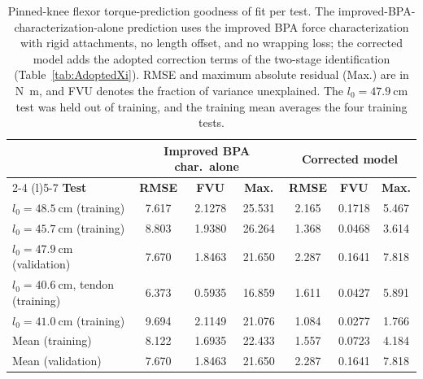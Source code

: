 \begin{table}[htbp]
\caption{Pinned-knee flexor torque-prediction goodness of fit per test. The improved-BPA-characterization-alone prediction uses the improved BPA force characterization with rigid attachments, no length offset, and no wrapping loss; the corrected model adds the adopted correction terms of the two-stage identification (Table~\ref{tab:AdoptedXi}). RMSE and maximum absolute residual (Max.) are in \unit{\newton\meter}, and FVU denotes the fraction of variance unexplained. The $l_{0}=\qty{47.9}{\cm}$ test was held out of training, and the training mean averages the four training tests.}
\label{tab:FlxPinGof}
\begin{tabular}{@{}lcccccc@{}}
\toprule
& \multicolumn{3}{c}{\textbf{Improved BPA char.\ alone}} & \multicolumn{3}{c}{\textbf{Corrected model}} \\
\cmidrule(lr){2-4} \cmidrule(l){5-7}
\textbf{Test} & \textbf{RMSE} & \textbf{FVU} & \textbf{Max.} & \textbf{RMSE} & \textbf{FVU} & \textbf{Max.} \\
\midrule
$l_{0}=\qty{48.5}{\cm}$ (training)        & 7.617 & 2.1278 & 25.531 & 2.165 & 0.1718 & 5.467 \\
$l_{0}=\qty{45.7}{\cm}$ (training)        & 8.803 & 1.9380 & 26.264 & 1.368 & 0.0468 & 3.614 \\
$l_{0}=\qty{47.9}{\cm}$ (validation)      & 7.670 & 1.8463 & 21.650 & 2.287 & 0.1641 & 7.818 \\
$l_{0}=\qty{40.6}{\cm}$, tendon (training) & 6.373 & 0.5935 & 16.859 & 1.611 & 0.0427 & 5.891 \\
$l_{0}=\qty{41.0}{\cm}$ (training)        & 9.694 & 2.1149 & 21.076 & 1.084 & 0.0277 & 1.766 \\
\midrule
Mean (training)                           & 8.122 & 1.6935 & 22.433 & 1.557 & 0.0723 & 4.184 \\
Mean (validation)                         & 7.670 & 1.8463 & 21.650 & 2.287 & 0.1641 & 7.818 \\
\bottomrule
\end{tabular}
\end{table}

